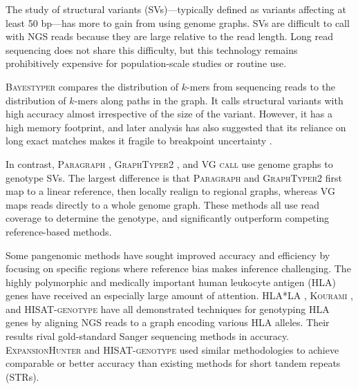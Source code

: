 The study of structural variants (SVs)---typically defined as variants affecting at least 50 bp---has more to gain from using genome graphs.
SVs are difficult to call with NGS reads because they are large relative to the read length.
Long read sequencing does not share this difficulty, but this technology remains prohibitively expensive for population-scale studies or routine use.

\textsc{Bayestyper} \cite{sibbesen2018accurate} compares the distribution of $k$-mers from sequencing reads to the distribution of $k$-mers along paths in the graph.
It calls structural variants with high accuracy almost irrespective of the size of the variant.
However, it has a high memory footprint, and later analysis has also suggested that its reliance on long exact matches makes it fragile to breakpoint uncertainty \cite{hickey2019genotyping}.

In contrast, \textsc{Paragraph} \cite{chen2019paragraph}, \textsc{GraphTyper2} \cite{eggertsson2019graphtyper2}, and \textsc{VG call} \cite{hickey2019genotyping} use genome graphs to genotype SVs.
The largest difference is that \textsc{Paragraph} and \textsc{GraphTyper2} first map to a linear reference, then locally realign to regional graphs, whereas VG maps reads directly to a whole genome graph.
These methods all use read coverage to determine the genotype, and significantly outperform competing reference-based methods.

Some pangenomic methods have sought improved accuracy and efficiency by focusing on specific regions where reference bias makes inference challenging. 
The highly polymorphic and medically important human leukocyte antigen (HLA) genes have received an especially large amount of attention.
\textsc{HLA*LA} \cite{dilthey2019hla}, \textsc{Kourami} \cite{lee2018kourami}, and \textsc{HISAT-genotype} \cite{Kim_2019} have all demonstrated techniques for genotyping HLA genes by aligning NGS reads to a graph encoding various HLA alleles.
Their results rival gold-standard Sanger sequencing methods in accuracy.
\textsc{ExpansionHunter} \cite{dolzhenko2019expansionhunter} and \textsc{HISAT-genotype} \cite{Kim_2019} used similar methodologies to achieve comparable or better accuracy than existing methods for short tandem repeats (STRs).

